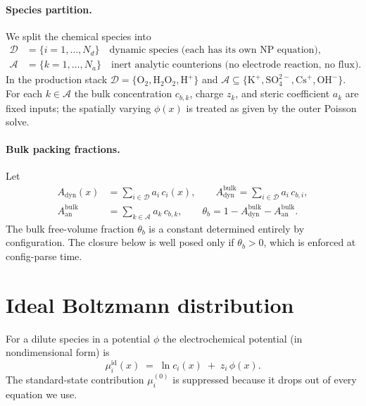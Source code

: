\documentclass[11pt]{article}
\newcommand{\dynset}{\mathcal{D}}      %
\newcommand{\anset}{\mathcal{A}}       %
\begin{document}
\paragraph{Species partition.}
We split the chemical species into
\begin{align}
\dynset &= \{i = 1,\dots,N_d\} \quad
  \text{dynamic species (each has its own NP equation)},\\
\anset &= \{k = 1,\dots,N_a\} \quad
  \text{inert analytic counterions (no electrode reaction, no flux)}.
\end{align}
In the production stack $\dynset = \{\mathrm{O}_2,\mathrm{H}_2\mathrm{O}_2,
\mathrm{H}^+\}$ and $\anset \subseteq \{\mathrm{K}^+,
\mathrm{SO}_4^{2-}, \mathrm{Cs}^+, \mathrm{OH}^-\}$. For each $k\in\anset$
the bulk concentration $c_{b,k}$, charge $z_k$, and steric coefficient
$a_k$ are fixed inputs; the spatially varying $\phi(x)$ is treated as
given by the outer Poisson solve.

\paragraph{Bulk packing fractions.}
Let
\begin{align}
A_{\mathrm{dyn}}(x) &= \sum_{i\in\dynset} a_i\, c_i(x),
   \qquad A^{\mathrm{bulk}}_{\mathrm{dyn}} = \sum_{i\in\dynset} a_i\, c_{b,i}, \\
A_{\mathrm{an}}^{\mathrm{bulk}}  &= \sum_{k\in\anset} a_k\, c_{b,k},
   \qquad
\theta_b = 1 - A^{\mathrm{bulk}}_{\mathrm{dyn}} - A_{\mathrm{an}}^{\mathrm{bulk}}.
\label{eq:thetab}
\end{align}
The bulk free-volume fraction $\theta_b$ is a constant determined entirely
by configuration. The closure below is well posed only if $\theta_b > 0$,
which is enforced at config-parse time.

\section{Ideal Boltzmann distribution}

For a dilute species in a potential $\phi$ the electrochemical potential
(in nondimensional form) is~\cite{Newman2004}
\begin{equation}
\mu_i^{\mathrm{id}}(x) \;=\; \ln c_i(x) \;+\; z_i\,\phi(x).
\label{eq:mu_ideal}
\end{equation}
The standard-state contribution $\mu_i^{(0)}$ is suppressed because it
drops out of every equation we use.
\end{document}
